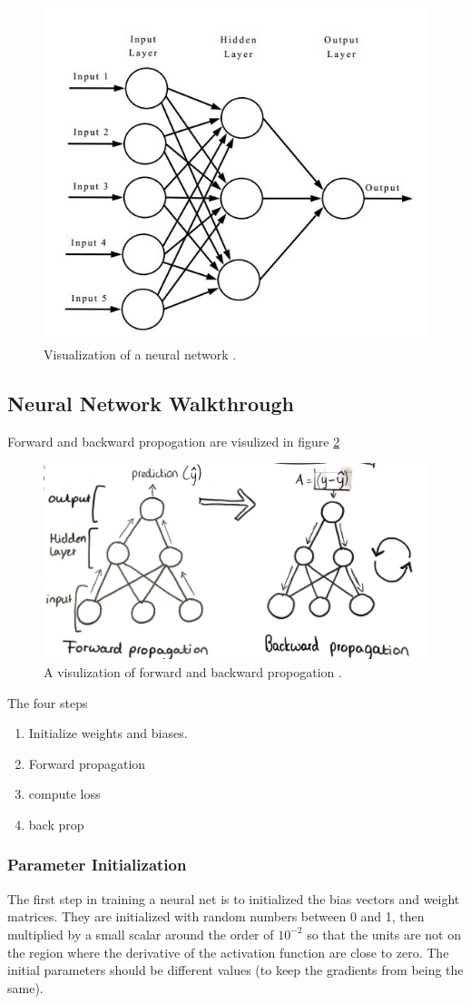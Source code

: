 \documentclass[12pt]{article}
\begin{document}
	\begin{figure}
		\centering
		\includegraphics[width=0.6\linewidth]{nnDiagram}
		\caption{Visualization of a neural network \cite{nnDiagramStack}. }
		\label{fig:nndiagram}
	\end{figure}
	
	
	\subsection{Neural Network Walkthrough}
	
	Forward and backward propogation are visulized in figure \ref{fig:forwardbackwardprop}
	\begin{figure}
		\centering
		\includegraphics[width=0.7\linewidth]{forwardBackwardProp}
		\caption{A visulization of forward and backward propogation \cite{nnBlog}.}
		\label{fig:forwardbackwardprop}
	\end{figure}

	The four steps
	\begin{enumerate}\singlespacing
		\item Initialize weights and biases. 
		\item Forward propagation
		\item compute loss
		\item back prop
	\end{enumerate}\doublespacing
	\subsubsection{Parameter Initialization}
	The first step in training a neural net is to initialized the bias vectors and weight  matrices. They are initialized with random numbers between 0 and 1, then multiplied by a small scalar around the order of $10^{-2}$ so that the units are not on the region where the derivative of the activation function are close to zero. The initial parameters should be different values (to keep the gradients from being the same).
	
\end{document}
